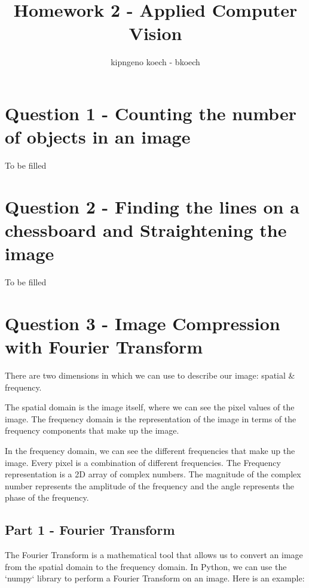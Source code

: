 \documentclass[a3paper,12pt]{extarticle} %
\begin{document}
\author{kipngeno koech - bkoech}
\title{Homework 2 - Applied Computer Vision}   
\maketitle

\medskip

\maketitle

\section{Question 1 - Counting the number of objects in an image}

To be filled


\section{Question 2 - Finding the lines on a chessboard and Straightening the image}

To be filled

\section {Question 3 - Image Compression with Fourier Transform}

There are two dimensions in which we can use to describe our image: spatial \& frequency.

The spatial domain is the image itself, where we can see the pixel values of the image. The frequency domain is the representation of the image in terms of the frequency components that make up the image. 

In the frequency domain, we can see the different frequencies that make up the image. Every pixel is a combination of different frequencies.
The Frequency representation is a 2D array of complex numbers. The magnitude of the complex number represents the amplitude of the frequency and the angle represents the phase of the frequency.

\subsection{Part 1 - Fourier Transform}

The Fourier Transform is a mathematical tool that allows us to convert an image from the spatial domain to the frequency domain. In Python, we can use the `numpy` library to perform a Fourier Transform on an image. Here is an example:
\end{document}
